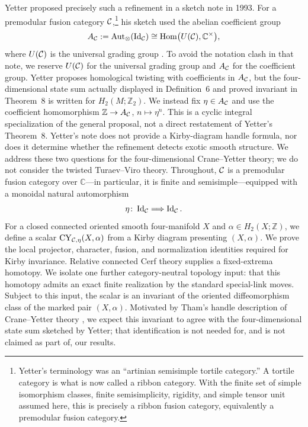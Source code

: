 Yetter proposed precisely such a refinement in a sketch note in 1993.  For a
premodular fusion category $\mathcal{C}$,\footnote{Yetter's terminology was an
``artinian semisimple tortile category.''  A tortile category is what is now
called a ribbon category.  With the finite set of simple isomorphism classes,
finite semisimplicity, rigidity, and simple tensor unit assumed here, this is
precisely a ribbon fusion category, equivalently a premodular fusion category.}
his sketch used the abelian coefficient group
\[
  A_{\mathcal{C}}:=\operatorname{Aut}_{\otimes}(\operatorname{Id}_{\mathcal{C}})
  \cong\operatorname{Hom}\bigl(U(\mathcal{C}),\mathbb C^\times\bigr),
\]
    where $U(\mathcal{C})$ is the universal grading group
    \cite[Definitions~1 and~3 and Proposition~4]{Yetter1993}.  To avoid the
notation clash in that note, we reserve $U(\mathcal{C})$ for the universal grading
    group and $A_{\mathcal{C}}$ for the coefficient group.  Yetter proposes homological
    twisting with coefficients in $A_{\mathcal{C}}$, but the four-dimensional state sum
    actually displayed in Definition~6 and proved invariant in Theorem~8 is
    written for $H_2(M;\mathbb Z_2)$.  We instead fix
    $\eta\in A_{\mathcal{C}}$ and use the coefficient homomorphism
    $\mathbb Z\to A_{\mathcal{C}}$, $n\mapsto\eta^n$.  This is a cyclic integral
    specialization of the general proposal, not a direct restatement of
    Yetter's Theorem~8.  Yetter's note does not provide
a Kirby-diagram handle formula, nor does it determine whether the refinement
detects exotic smooth structure. We address these two questions for the
four-dimensional Crane--Yetter theory; we do not consider the twisted
Turaev--Viro theory. Throughout, $\mathcal{C}$ is a premodular fusion category over
$\mathbb C$---in particular, it is finite and semisimple---equipped with a
monoidal natural automorphism
\[
  \eta\colon \operatorname{Id}_{\mathcal{C}}\Longrightarrow
  \operatorname{Id}_{\mathcal{C}}.
\]
For a closed connected oriented smooth four-manifold $X$ and
$\alpha\in H_2(X;\mathbb Z)$, we
define a scalar $\operatorname{CY}_{\mathcal{C},\eta}(X,\alpha)$ from a Kirby diagram presenting
$(X,\alpha)$.  We prove the local projector, character, fusion, and
normalization identities required for Kirby invariance.  Relative connected
Cerf theory supplies a fixed-extrema homotopy.  We isolate one further
category-neutral topology input: that this homotopy admits an exact finite
realization by the standard special-link moves.  Subject to this input, the
scalar is an invariant of the oriented
diffeomorphism class of the marked pair $(X,\alpha)$.  Motivated
by Tham's handle description of Crane--Yetter theory
\cite[Definition~5.11]{Tham2021}, we expect this invariant
to agree with the four-dimensional state sum sketched by Yetter; that
identification is not needed for, and is not claimed as part of, our results.

